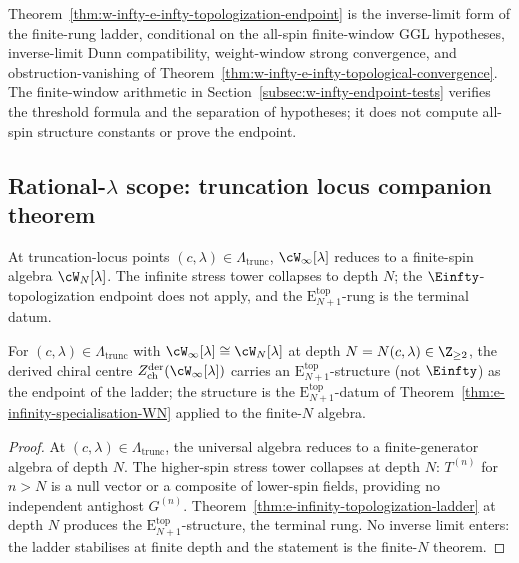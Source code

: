 \begin{remark}
\label{rem:endpoint-versus-finite-rungs}
Theorem~\ref{thm:w-infty-e-infty-topologization-endpoint} is the
inverse-limit form of the finite-rung ladder, conditional on the
all-spin finite-window GGL hypotheses, inverse-limit Dunn
compatibility, weight-window strong convergence, and
obstruction-vanishing of
Theorem~\ref{thm:w-infty-e-infty-topological-convergence}. The
finite-window arithmetic in
Section~\ref{subsec:w-infty-endpoint-tests} verifies the threshold
formula and the separation of hypotheses; it does not compute
all-spin structure constants or prove the endpoint.
\end{remark}

\subsection{Rational-\texorpdfstring{$\lambda$}{lambda} scope:
truncation locus companion theorem}
\label{subsec:rational-lambda-scope}

At truncation-locus points
$(c, \lambda) \in \Lambda_{\mathrm{trunc}}$,
$\cW_\infty[\lambda]$ reduces to a finite-spin algebra
$\cW_N[\lambda]$. The infinite stress tower collapses to depth
$N$; the $\Einfty$-topologization endpoint does not apply, and
the $\mathrm{E}_{N+1}^{\mathrm{top}}$-rung is the terminal datum.

\begin{theorem}
\label{thm:truncation-locus-companion}
For $(c, \lambda) \in \Lambda_{\mathrm{trunc}}$ with
$\cW_\infty[\lambda] \cong \cW_N[\lambda]$ at depth $N =
N(c, \lambda) \in \Z_{\ge 2}$, the derived chiral centre
$Z^{\mathrm{der}}_{\mathrm{ch}}(\cW_\infty[\lambda])$ carries an
$\mathrm{E}_{N+1}^{\mathrm{top}}$-structure (not $\Einfty$) as the
endpoint of the ladder; the structure is the
$\mathrm{E}_{N+1}^{\mathrm{top}}$-datum of
Theorem~\textup{\ref{thm:e-infinity-specialisation-WN}} applied to
the finite-$N$ algebra.
\end{theorem}

\begin{proof}
At $(c, \lambda) \in \Lambda_{\mathrm{trunc}}$, the universal
algebra reduces to a finite-generator algebra of depth $N$. The
higher-spin stress tower collapses at depth $N$: $T^{(n)}$ for
$n > N$ is a null vector or a composite of lower-spin fields,
providing no independent antighost $G^{(n)}$.
Theorem~\ref{thm:e-infinity-topologization-ladder} at depth $N$
produces the $\mathrm{E}_{N+1}^{\mathrm{top}}$-structure, the
terminal rung. No inverse limit enters: the ladder stabilises at
finite depth and the statement is the finite-$N$ theorem.
\end{proof}

